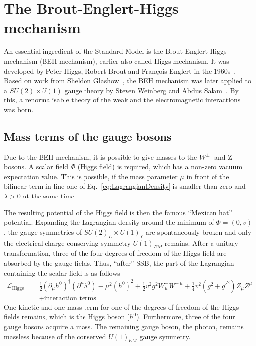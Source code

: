 \section{The Brout-Englert-Higgs mechanism}
\label{sec:HiggsMechanism}
An essential ingredient of the Standard Model is the Brout-Englert-Higgs mechanism (BEH mechanism), earlier also called Higgs mechanism.
It was developed by Peter Higgs, Robert Brout and Fran\c{c}ois Englert in the 1960s~\cite{bib:HiggsMechanism_Brout_Englert,bib:Higgs_Prediction,bib:Higgs_Prediction_2,bib:HiggsMechanism_Guralnik_Hagen_Kibble,bib:HiggsMechanism_Higgs_1966,bib:HiggsMechanism_Kibble_1967}. 
Based on work from Sheldon Glashow~\cite{bib:HiggsMechanism_Glashow_1961}, the BEH mechanism was later applied to a $SU(2) \times U(1)$ gauge theory by Steven Weinberg and Abdus Salam~\cite{bib:HiggsMechanism_Weinberg_1967,bib:HiggsMechanism_Salam_1968}.
By this, a renormalisable theory of the weak and the electromagnetic interactions was born.

\subsection*{Mass terms of the gauge bosons}
Due to the BEH mechanism, it is possible to give masses to the $W^{\pm}$- and Z-bosons.
A scalar field $\Phi$ (Higgs field) is required, which has a non-zero vacuum expectation value.
This is possible, if the mass parameter $\mu$ in front of the bilinear term in line one of Eq.~\eqref{eq:LagrangianDensity} is smaller than zero and $\lambda>0$ at the same time.

The resulting potential of the Higgs field is then the famous ``Mexican hat'' potential.
Expanding the Lagrangian density around the minimum of $\Phi = \left( 0,v \right)$, the gauge symmetries of $SU(2)_L \times U(1)_Y$ are spontaneously broken and only the electrical charge conserving symmetry $U(1)_{EM}$ remains.
After a unitary transformation, three of the four degrees of freedom of the Higgs field are absorbed by the gauge fields.
Thus, ``after'' SSB, the part of the Lagrangian containing the scalar field is as follows
\begin{equation}
\begin{split}
\mathcal{L}_{\text{Higgs}} =& \frac{1}{2} \left( \partial_{\mu} h^0 \right)^{\dagger} \left( \partial^{\mu} h^0 \right) - \mu^2 \left(h^0\right)^2 + \frac{1}{2} v^2 g^2 W_{\mu}^- W^{+\,\mu}
                    + \frac{1}{4} v^2 \left(g^2 + g'^2  \right)  Z_{\mu} Z^{\mu}\\
  &+ \text{interaction terms}
\end{split}
\label{eq:LHiggs}
\end{equation}
One kinetic and one mass term for one of the degrees of freedom of the Higgs fields remains, which is the Higgs boson ($h^0$).
Furthermore, three of the four gauge bosons acquire a mass.
The remaining gauge boson, the photon, remains massless because of the conserved $U(1)_{EM}$ gauge symmetry.

